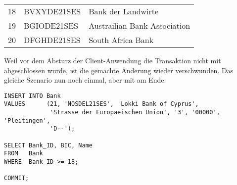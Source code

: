           \begin{center}
            \begin{small}
              \tablehead{}
              \begin{msoraclesql}
                \begin{supertabular}{rll}
                  18 & BVXYDE21SES & Bank der Landwirte \\
                  19 & BGIODE21SES & Austrailian Bank Association \\
                  20 & DFGHDE21SES & South Africa Bank \\
                \end{supertabular}
              \end{msoraclesql}
            \end{small}
          \end{center}
          Weil vor dem Absturz der Client-Anwendung die Transaktion nicht mit
          \COMMIT{} abgeschlossen wurde, ist die gemachte \"Anderung wieder
          verschwunden. Das gleiche Szenario nun noch einmal, aber mit \COMMIT{}
          am Ende.
          \begin{lstlisting}[language=oracle_sql,label=sql07_26]
INSERT INTO Bank
VALUES      (21, 'NOSDEL21SES', 'Lokki Bank of Cyprus',
             'Strasse der Europaeischen Union', '3', '00000', 'Pleitingen',
             'D--');

SELECT Bank_ID, BIC, Name
FROM   Bank
WHERE  Bank_ID >= 18;

COMMIT;
          \end{lstlisting}
